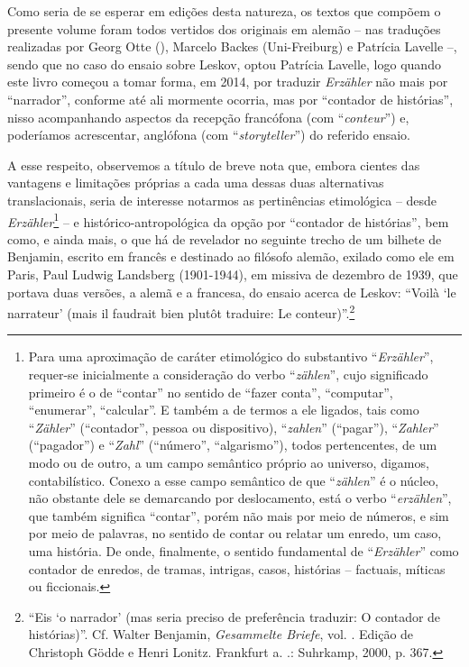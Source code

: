 Como seria de se esperar em edições desta natureza, os textos que
compõem o presente volume foram todos vertidos dos originais em alemão
-- nas traduções realizadas por Georg Otte (), Marcelo Backes
(Uni-Freiburg) e Patrícia Lavelle --, sendo que no caso do ensaio sobre
Leskov, optou Patrícia Lavelle, logo quando este livro começou a tomar
forma, em 2014, por traduzir \emph{Erzähler} não mais por ``narrador'',
conforme até ali mormente ocorria, mas por ``contador de histórias'',
nisso acompanhando aspectos da recepção francófona (com
``\emph{conteur}'') e, poderíamos acrescentar, anglófona (com
``\emph{storyteller}'') do referido ensaio.

A esse respeito, observemos a título de breve nota que, embora cientes
das vantagens e limitações próprias a cada uma dessas duas alternativas
translacionais, seria de interesse notarmos as pertinências etimológica
-- desde \emph{Erzähler}\footnote{Para uma aproximação de caráter
  etimológico do substantivo ``\emph{Erzähler}'', requer-se inicialmente
  a consideração do verbo ``\emph{zählen}'', cujo significado primeiro é
  o de ``contar'' no sentido de ``fazer conta'', ``computar'',
  ``enumerar'', ``calcular''. E também a de termos a ele ligados, tais
  como ``\emph{Zähler}'' (``contador'', pessoa ou dispositivo),
  ``\emph{zahlen}'' (``pagar''), ``\emph{Zahler}'' (``pagador'') e
  ``\emph{Zahl}'' (``número'', ``algarismo''), todos pertencentes, de um
  modo ou de outro, a um campo semântico próprio ao universo, digamos,
  contabilístico. Conexo a esse campo semântico de que ``\emph{zählen}''
  é o núcleo, não obstante dele se demarcando por deslocamento, está o
  verbo ``\emph{erzählen}'', que também significa ``contar'', porém não
  mais por meio de números, e sim por meio de palavras, no sentido de
  contar ou relatar um enredo, um caso, uma história. De onde,
  finalmente, o sentido fundamental de ``\emph{Erzähler}'' como contador
  de enredos, de tramas, intrigas, casos, histórias -- factuais, míticas
  ou ficcionais.} -- e histórico-antropológica da opção por ``contador
de histórias'', bem como, e ainda mais, o que há de revelador no
seguinte trecho de um bilhete de Benjamin, escrito em francês e
destinado ao filósofo alemão, exilado como ele em Paris, Paul Ludwig
Landsberg (1901-1944), em missiva de dezembro de 1939, que portava duas
versões, a alemã e a francesa, do ensaio acerca de Leskov: ``Voilà `le
narrateur' (mais il faudrait bien plutôt traduire: Le
conteur)''.\footnote{``Eis `o narrador' (mas seria preciso de
  preferência traduzir: O contador de histórias)''. Cf. Walter Benjamin,
  \emph{Gesammelte Briefe}, vol. . Edição de Christoph Gödde e Henri
  Lonitz. Frankfurt a. .: Suhrkamp, 2000, p. 367.}

